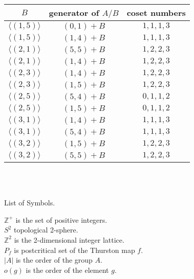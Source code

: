 \documentclass[article,dvisp]{amsart}
\def\Z{\mathbb{Z}}
\theoremstyle{definition}
\theoremstyle{remark}
\numberwithin{equation}{section}
\theoremstyle{lemma}
\begin{document}
\quad
\begin{tabular}{|c|c|c|}
\hline
$B$&generator of $A/B$&coset numbers\\
\hline
$\langle(1,5)\rangle$&$(0,1)+B$&$1,1,1,3$\\
\hline
$\langle(1,5)\rangle$&$(1,4)+B$&$1,1,1,3$\\
\hline
$\langle(2,1)\rangle$&$(5,5)+B$&$1,2,2,3$\\
\hline
$\langle(2,1)\rangle$&$(1,4)+B$&$1,2,2,3$\\
\hline
$\langle(2,3)\rangle$&$(1,4)+B$&$1,2,2,3$\\
\hline
$\langle(2,3)\rangle$&$(1,5)+B$&$1,2,2,3$\\
\hline
$\langle(2,5)\rangle$&$(5,4)+B$&$0,1,1,2$\\
\hline
$\langle(2,5)\rangle$&$(1,5)+B$&$0,1,1,2$\\
\hline
$\langle(3,1)\rangle$&$(1,4)+B$&$1,1,1,3$\\
\hline
$\langle(3,1)\rangle$&$(5,4)+B$&$1,1,1,3$\\
\hline
$\langle(3,2)\rangle$&$(1,5)+B$&$1,2,2,3$\\
\hline
$\langle(3,2)\rangle$&$(5,5)+B$&$1,2,2,3$\\
\hline
\end{tabular}\\
\\
\begin{center}
List of Symbols.
\end{center}
$\Z^{+}$ is the set of positive integers.\\
$S^{2}$ topological 2-sphere.\\
$\Z^{2}$ is the 2-dimensional integer lattice.\\ 
$P_{f}$ is postcritical set of the Thurston map $f$.\\
$|A|$ is the order of the group $A$.\\
$o(g)$ is the order of the element $g$.\\
\end{document}
